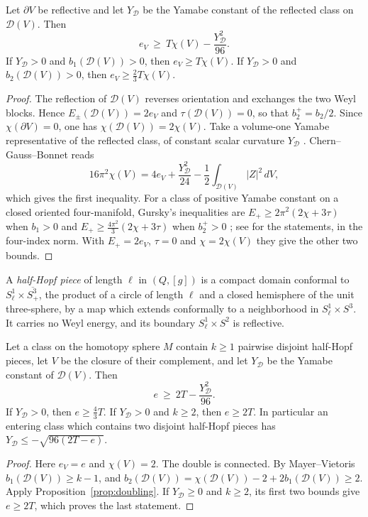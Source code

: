 \begin{proposition}\label{prop:doubling}
Let \(\partial V\) be reflective and let \(Y_{\mathcal D}\) be the Yamabe
constant of the reflected class on \(\mathcal D(V)\). Then
\[
 e_V\ \ge\ T\chi(V)-\frac{Y_{\mathcal D}^2}{96}.
\]
If \(Y_{\mathcal D}>0\) and \(b_1(\mathcal D(V))>0\), then
\(e_V\ge T\chi(V)\). If \(Y_{\mathcal D}>0\) and
\(b_2(\mathcal D(V))>0\), then \(e_V\ge\tfrac23T\chi(V)\).
\end{proposition}
\begin{proof}
The reflection of \(\mathcal D(V)\) reverses orientation and exchanges
the two Weyl blocks. Hence \(E_\pm(\mathcal D(V))=2e_V\) and
\(\tau(\mathcal D(V))=0\), so that \(b_2^+=b_2/2\). Since
\(\chi(\partial V)=0\), one has \(\chi(\mathcal D(V))=2\chi(V)\).
Take a volume-one Yamabe representative of the reflected class, of
constant scalar curvature \(Y_{\mathcal D}\)
\cite{Schoen1984Yamabe,LeeParker1987Yamabe}. Chern--Gauss--Bonnet reads
\[
 16\pi^2\chi(V)=4e_V+\frac{Y_{\mathcal D}^2}{24}
       -\frac12\int_{\mathcal D(V)}|Z|^2\,dV ,
\]
which gives the first inequality. For a class of positive Yamabe
constant on a closed oriented four-manifold, Gursky's inequalities are
\(E_+\ge2\pi^2(2\chi+3\tau)\) when \(b_1>0\) and
\(E_+\ge\tfrac{4\pi^2}{3}(2\chi+3\tau)\) when \(b_2^+>0\)
\cite{Gursky1998WeylFunctional}; see
\cite[Theorems~A and~C]{Fu2018FourManifolds} for the statements, in the
four-index norm. With \(E_+=2e_V\), \(\tau=0\) and
\(\chi=2\chi(V)\) they give the other two bounds.
\end{proof}

A \emph{half-Hopf piece} of length \(\ell\) in \((Q,[g])\) is a compact
domain conformal to \(S^1_\ell\times\overline{S^3_+}\), the product of a
circle of length \(\ell\) and a closed hemisphere of the unit
three-sphere, by a map which extends conformally to a neighborhood in
\(S^1_\ell\times S^3\). It carries no Weyl energy, and its boundary
\(S^1_\ell\times S^2\) is reflective.

\begin{corollary}\label{cor:half-hopf}
Let a class on the homotopy sphere \(M\) contain \(k\ge1\) pairwise
disjoint half-Hopf pieces, let \(V\) be the closure of their complement,
and let \(Y_{\mathcal D}\) be the Yamabe constant of \(\mathcal D(V)\).
Then
\[
 e\ \ge\ 2T-\frac{Y_{\mathcal D}^2}{96}.
\]
If \(Y_{\mathcal D}>0\), then \(e\ge\tfrac43T\). If
\(Y_{\mathcal D}>0\) and \(k\ge2\), then \(e\ge2T\). In particular an
entering class which contains two disjoint half-Hopf pieces has
\(Y_{\mathcal D}\le-\sqrt{96(2T-e)}\).
\end{corollary}
\begin{proof}
Here \(e_V=e\) and \(\chi(V)=2\). The double is connected. By
Mayer--Vietoris \(b_1(\mathcal D(V))\ge k-1\), and
\(b_2(\mathcal D(V))=\chi(\mathcal D(V))-2+2b_1(\mathcal D(V))\ge2\).
Apply Proposition~\ref{prop:doubling}. If \(Y_{\mathcal D}\ge0\) and
\(k\ge2\), its first two bounds give \(e\ge2T\), which proves the last
statement.
\end{proof}

